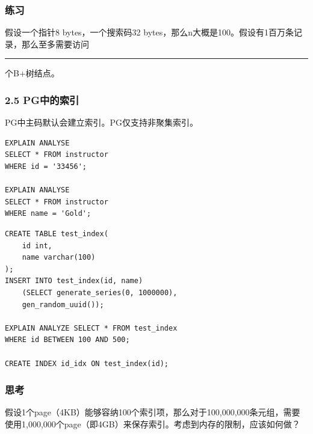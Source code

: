 \documentclass[aspectratio=169, 14pt]{beamer}
\begin{document}
\begin{frame}[fragile]
    \frametitle{练习}


假设一个指针8 bytes，一个搜索码32 bytes，那么n大概是100。假设有1百万条记录，那么至多需要访问\rule{1cm}{0.15mm}个B+树结点。

\end{frame}

\begin{frame}[fragile]
    \frametitle{2.5 PG中的索引}
PG中主码默认会建立索引。PG仅支持非聚集索引。
    
\begin{verbatim} 
EXPLAIN ANALYSE 
SELECT * FROM instructor
WHERE id = '33456';

EXPLAIN ANALYSE 
SELECT * FROM instructor
WHERE name = 'Gold';
\end{verbatim}
\end{frame}

\begin{frame}[fragile]
    \begin{verbatim} 
CREATE TABLE test_index(
    id int,
    name varchar(100)
);
INSERT INTO test_index(id, name)
    (SELECT generate_series(0, 1000000), 
    gen_random_uuid());

EXPLAIN ANALYZE SELECT * FROM test_index
WHERE id BETWEEN 100 AND 500;

CREATE INDEX id_idx ON test_index(id);
    \end{verbatim}
    

\end{frame}

\begin{frame}
    \frametitle{思考}
假设1个page（4KB）能够容纳100个索引项，那么对于100,000,000条元组，需要使用1,000,000个page（即4GB）来保存索引。考虑到内存的限制，应该如何做？
    

\end{frame}
\end{document}
